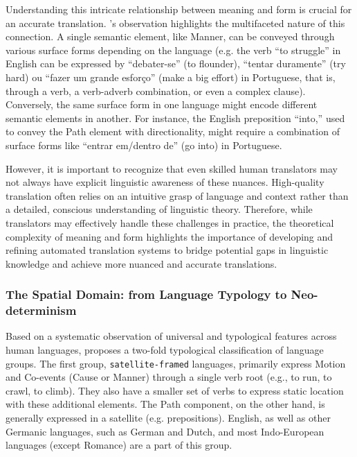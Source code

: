{{Understanding this intricate relationship between meaning and form is crucial for an accurate translation. \textcite{talmy2000towardb}'s observation highlights the multifaceted nature of this connection. A single semantic element, like Manner, can be conveyed through various surface forms depending on the language (e.g. the verb ``to struggle'' in English can be expressed by ``debater-se'' (to flounder), ``tentar duramente'' (try hard)  ou ``fazer um grande esforço'' (make a big effort) in Portuguese, that is, through a verb, a verb-adverb combination, or even a complex clause). Conversely, the same surface form in one language might encode different semantic elements in another. For instance, the English preposition ``into,'' used to convey the Path element with directionality, might require a combination of surface forms like ``entrar em/dentro de'' (go into) in Portuguese.

However, it is important to recognize that even skilled human translators may not always have explicit linguistic awareness of these nuances. High-quality translation often relies on an intuitive grasp of language and context rather than a detailed, conscious understanding of linguistic theory. Therefore, while translators may effectively handle these challenges in practice, the theoretical complexity of meaning and form highlights the importance of developing and refining automated translation systems to bridge potential gaps in linguistic knowledge and achieve more nuanced and accurate translations.

\subsubsection{The Spatial Domain: from Language Typology to Neo-determinism}

Based on a systematic observation of universal and typological features across human languages, \textcite{talmy2000towardb} proposes a two-fold typological classification of language groups. The first group, \texttt{satellite-framed} languages, primarily express Motion and Co-events (Cause or Manner) through a single verb root (e.g., to run, to crawl, to climb). They also have a smaller set of verbs to express static location with these additional elements. The Path component, on the other hand, is generally expressed in a satellite (e.g. prepositions). English, as well as other Germanic languages, such as German and Dutch, and most Indo-European languages (except Romance) are a part of this group. 

}}
